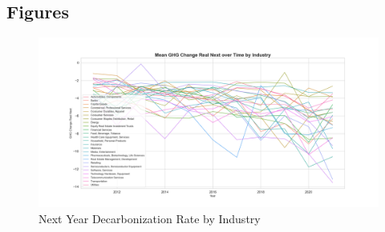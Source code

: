 


\subsection{Figures}

\begin{figure}[H]
\centering
  \includegraphics[width=\textwidth]{figures/ghg_change_real_next_over_time_by_industry.png}
\caption{Next Year Decarbonization Rate by Industry}
\label{fig:industry_vs_ghg_change_real_next}
\end{figure}

